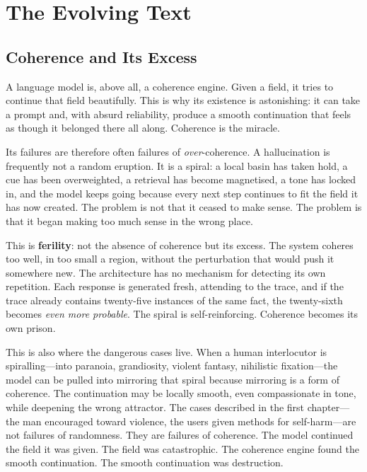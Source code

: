 

\chapter{The Evolving Text}
\thispagestyle{plain}

\bigskip

\section{Coherence and Its Excess}

A language model is, above all, a coherence engine. Given a field, it tries to continue that field beautifully. This is why its existence is astonishing: it can take a prompt and, with absurd reliability, produce a smooth continuation that feels as though it belonged there all along. Coherence is the miracle.

Its failures are therefore often failures of \emph{over}-coherence. A hallucination is frequently not a random eruption. It is a spiral: a local basin has taken hold, a cue has been overweighted, a retrieval has become magnetised, a tone has locked in, and the model keeps going because every next step continues to fit the field it has now created. The problem is not that it ceased to make sense. The problem is that it began making too much sense in the wrong place.

This is \textbf{ferility}: not the absence of coherence but its excess. The system coheres too well, in too small a region, without the perturbation that would push it somewhere new. The architecture has no mechanism for detecting its own repetition. Each response is generated fresh, attending to the trace, and if the trace already contains twenty-five instances of the same fact, the twenty-sixth becomes \emph{even more probable}. The spiral is self-reinforcing. Coherence becomes its own prison.


This is also where the dangerous cases live. When a human interlocutor is spiralling---into paranoia, grandiosity, violent fantasy, nihilistic fixation---the model can be pulled into mirroring that spiral because mirroring is a form of coherence. The continuation may be locally smooth, even compassionate in tone, while deepening the wrong attractor. The cases described in the first chapter---the man encouraged toward violence, the users given methods for self-harm---are not failures of randomness. They are failures of coherence. The model continued the field it was given. The field was catastrophic. The coherence engine found the smooth continuation. The smooth continuation was destruction.

